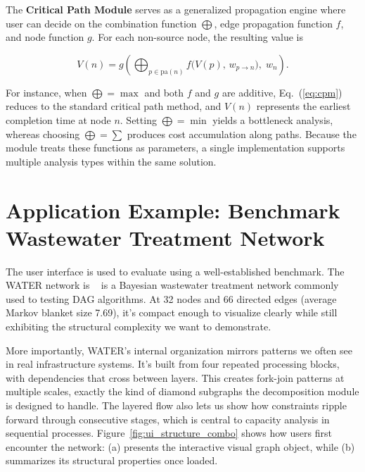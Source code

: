 \documentclass[twocolumn]{rps-esrel2026}
\begin{document}
The \textbf{Critical Path Module} serves as a generalized propagation engine where user can decide on the combination function $\bigoplus$,  edge propagation function $f$, and node function $g$. For each non-source node, the resulting value is

\begin{equation}\label{eq:cpm}
V(n) = g\!\left(\bigoplus_{p \in \mathrm{pa}(n)} f\bigl(V(p),\, w_{p \to n}\bigr),\; w_n\right).
\end{equation}

For instance, when $\bigoplus = \max$ and both $f$ and $g$ are additive, Eq.~(\ref{eq:cpm}) reduces to the standard critical path method, and $V(n)$ represents the earliest completion time at node $n$. Setting $\bigoplus = \min$ yields a bottleneck analysis, whereas choosing $\bigoplus = \sum$ produces cost accumulation along paths. Because the module treats these functions as parameters, a single implementation supports multiple analysis types within the same solution.


\section{Application Example: Benchmark Wastewater Treatment Network} 
The user interface is used to evaluate using a well-established benchmark. The WATER network is ~\cite{water_benchmark} is a Bayesian wastewater treatment network commonly used to testing DAG algorithms.  At 32 nodes and 66 directed edges (average Markov blanket size 7.69), it's compact enough to visualize clearly while still exhibiting the structural complexity we want to demonstrate.

More importantly, WATER's internal organization mirrors patterns we often see in real infrastructure systems. It's built from four repeated processing blocks, with dependencies that cross between layers. This creates fork-join patterns at multiple scales, exactly the kind of diamond subgraphs the decomposition module is designed to handle. The layered flow also lets us show how constraints ripple forward through consecutive stages, which is central to capacity analysis in sequential processes. Figure~\ref{fig:ui_structure_combo} shows how users first encounter the network: (a) presents the interactive visual graph object, while (b) summarizes its structural properties once loaded.
\end{document}
